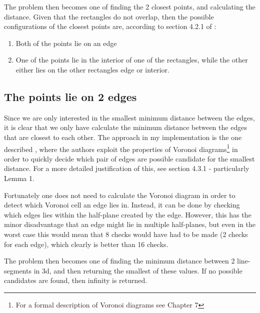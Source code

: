 The problem then becomes one of finding the 2 closest points, and calculating the distance.
Given that the rectangles do not overlap, then the possible configurations of the closest points are, according to section 4.2.1 of \cite{Larsen9fastproximity}:
\begin{enumerate}
\item Both of the points lie on an edge
\item One of the points lie in the interior of one of the rectangles, while the other either lies on the other rectangles edge or interior.
\end{enumerate}

\subsection{The points lie on 2 edges}
Since we are only interested in the smallest minimum distance between the edges, it is clear that we only have calculate the minimum distance between the edges that are closest to each other. The approach in my implementation is the one described \cite{Larsen99fastproximity}, where the authors exploit the properties of Voronoi diagrams\footnote{For a formal description of Voronoi diagrams see \cite{compgeom:2008} Chapter 7} in order to quickly decide which pair of edges are possible candidate for the smallest distance. For a more detailed justification of this, see \cite{Larsen99fastproximity} section 4.3.1 - particularly Lemma 1.  

Fortunately one does not need to calculate the Voronoi diagram in order to detect which Voronoi cell an edge lies in. Instead, it can be done by checking which edges lies within the half-plane created by the edge. However, this has the minor disadvantage that an edge might lie in multiple half-planes, but even in the worst case this would mean that 8 checks would have had to be made (2 checks for each edge), which clearly is better than 16 checks.

The problem then becomes one of finding the minimum distance between 2 line-segments in 3d, and then returning the smallest of these values. If no possible candidates are found, then infinity is returned.


